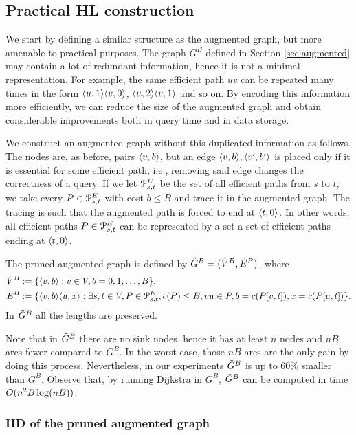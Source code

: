 \subsection{Practical HL construction}
\label{ssec:practical}

We start by defining a similar structure as the augmented graph, but more amenable to practical purposes.
The graph $G^B$ defined in Section \ref{sec:augmented} may contain a lot of redundant information, hence it is not a minimal representation.
For example, the same efficient path $uv$ can be repeated many times in the form $\langle u,1\rangle\langle v,0\rangle$, $\langle u,2\rangle\langle v,1\rangle$ and so on.
By encoding this information more efficiently, we can reduce the size of the augmented graph and obtain considerable improvements both in query time and in data storage.

We construct an augmented graph without this duplicated information as follows.
The nodes are, as before, pairs $\langle v,b\rangle$, but an edge $\langle v,b\rangle,\langle v',b'\rangle$ is placed only if it is essential for some efficient path, i.e., removing said edge changes the correctness of a query.
If we let $\mathcal{P}_{s,t}^E$ be the set of all efficient paths from $s$ to $t$, we take every $P\in \mathcal{P}_{s,t}^E$ with cost $b\leq B$ and trace it in the augmented graph.
The tracing is such that the augmented path is forced to end at $\langle t,0\rangle$.
In other words, all efficient paths $P\in \mathcal{P}_{s,t}^E$ can be represented by a set a set of efficient paths ending at $\langle t,0\rangle$. 

\begin{definition}\label{def:pruned_aug_graph}
The pruned augmented graph is defined by $\tilde G^B=(\tilde V^B,\tilde E^B)$, where
\begin{align*}
\tilde V^B &:=\{\langle v,b\rangle: v\in V, b=0,1,\ldots,B\},\\
\tilde E^B &:=\{\langle v,b\rangle\langle u,x\rangle : \exists s,t\in V, P\in\mathcal{P}^E_{s,t}, c(P)\leq B, 
 vu\in P, b=c(P[v,t]), x=c(P[u,t]) \}.
\end{align*}
In $\tilde G^B$ all the lengths are preserved.
\end{definition}
Note that in $\tilde G^B$ there are no sink nodes, hence it has at least $n$ nodes and $nB$ arcs fewer compared to $G^B$.
In the worst case, those $nB$ arcs are the only gain by doing this process.
Nevertheless, in our experiments $\tilde G^B$ is up to 60\% smaller than $G^B$.
Observe that, by running Dijkstra in $G^B$, $\tilde G^B$ can be computed in time $O(n^2B\log(nB))$.

\subsubsection{HD of the pruned augmented graph}

